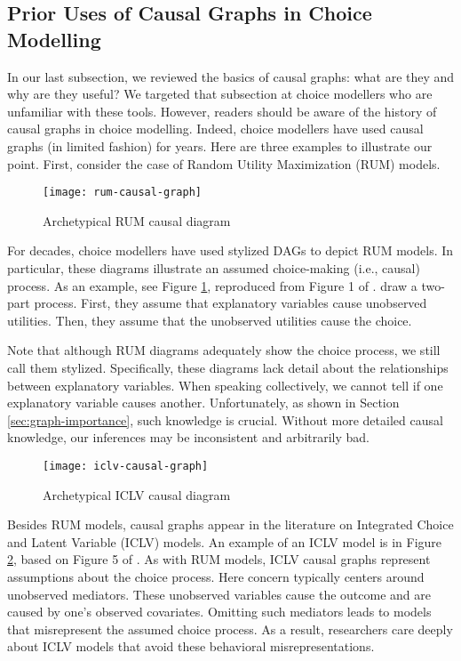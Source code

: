 \subsection{Prior Uses of Causal Graphs in Choice Modelling}
\label{sec:choice-graphs}

In our last subsection, we reviewed the basics of causal graphs: what are they and why are they useful?
We targeted that subsection at choice modellers who are unfamiliar with these tools.
However, readers should be aware of the history of causal graphs in choice modelling.
Indeed, choice modellers have used causal graphs (in limited fashion) for years.
Here are three examples to illustrate our point.
First, consider the case of Random Utility Maximization (RUM) models.

\begin{figure}
   \centering
   \texttt{[image: rum-causal-graph]}
   \caption{Archetypical RUM causal diagram}
   \label{fig:example-graph-rum}
\end{figure}

For decades, choice modellers have used stylized DAGs to depict RUM models.
In particular, these diagrams illustrate an assumed choice-making (i.e., causal) process.
As an example, see Figure \ref{fig:example-graph-rum}, reproduced from Figure 1 of \citet{ben_2002_integration}.
\citeauthor{ben_2002_integration} draw a two-part process.
First, they assume that explanatory variables cause unobserved utilities.
Then, they assume that the unobserved utilities cause the choice.

Note that although RUM diagrams adequately show the choice process, we still call them stylized.
Specifically, these diagrams lack detail about the relationships between explanatory variables.
When speaking collectively, we cannot tell if one explanatory variable causes another.
Unfortunately, as shown in Section \ref{sec:graph-importance}, such knowledge is crucial.
Without more detailed causal knowledge, our inferences may be inconsistent and arbitrarily bad.

\begin{figure}
   \centering
   \texttt{[image: iclv-causal-graph]}
   \caption{Archetypical ICLV causal diagram}
   \label{fig:example-graph-iclv}
\end{figure}


Besides RUM models, causal graphs appear in the literature on Integrated Choice and Latent Variable (ICLV) models.
An example of an ICLV model is in Figure \ref{fig:example-graph-iclv}, based on Figure 5 of \citet{ben_2002_integration}.
As with RUM models, ICLV causal graphs represent assumptions about the choice process.
Here concern typically centers around unobserved mediators.
These unobserved variables cause the outcome and are caused by one's observed covariates.
Omitting such mediators leads to models that misrepresent the assumed choice process.
As a result, researchers care deeply about ICLV models that avoid these behavioral misrepresentations.

